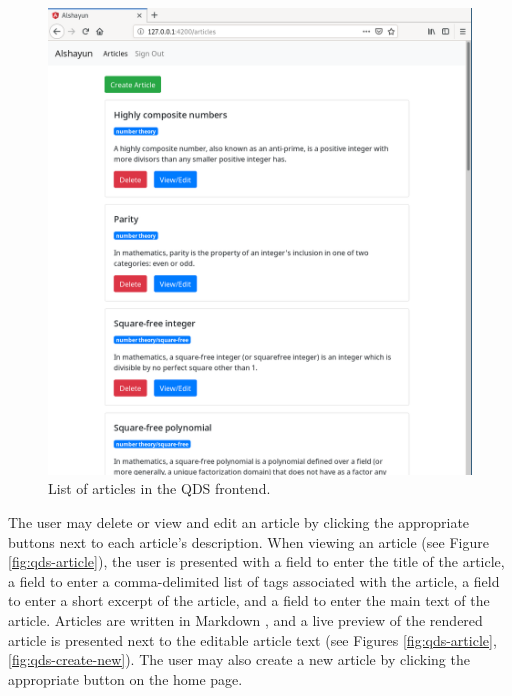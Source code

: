 \documentclass[12pt]{report}
\begin{document}
\begin{figure}
    \centering
    \includegraphics[scale=0.4]{images/qds-articles.png}
    \caption{List of articles in the QDS frontend.}
    \label{fig:qds-articles}
\end{figure}

The user may delete or view and edit an article by clicking the appropriate
buttons next to each article's description. When viewing an article (see Figure
\ref{fig:qds-article}), the user is presented with a field to enter the title of
the article, a field to enter a comma-delimited list of tags associated with the
article, a field to enter a short excerpt of the article, and a field to enter
the main text of the article. Articles are written in Markdown \cite{markdown},
and a live preview of the rendered article is presented next to the editable
article text (see Figures \ref{fig:qds-article}, \ref{fig:qds-create-new}).  The
user may also create a new article by clicking the appropriate button on the
home page.
\end{document}

